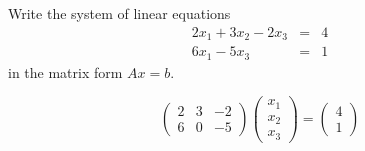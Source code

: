 \documentclass{ximera}
\begin{document}
\begin{exercise} \label{c4.1.4}
Write the system of linear equations
\begin{eqnarray*}
2x_1 + 3x_2 - 2x_3 & = & 4\\
6x_1 -5x_3 & = & 1
\end{eqnarray*}
in the matrix form $Ax=b$.

\begin{solution}

\[
\left(\begin{array}{rrr} 2 & 3 & -2 \\ 6 & 0 & -5\end{array}\right) 
\left(\begin{array}{r} x_1 \\ x_2 \\ x_3\end{array}\right) = 
\left(\begin{array}{r} 4 \\ 1\end{array}\right)
\]


\end{solution}
\end{exercise}
\end{document}
